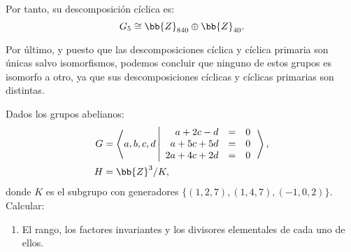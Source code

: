 \begin{ejercicio}
\begin{enumerate}
        Por tanto, su descomposición cíclica es:
        \begin{equation*}
            G_5 \cong \bb{Z}_{840} \oplus \bb{Z}_{40}.
        \end{equation*}


    \end{enumerate}

    Por último, y puesto que las descomposiciones cíclica y cíclica primaria son únicas salvo isomorfismos, podemos concluir que ninguno de estos grupos es isomorfo a otro, ya que sus descomposiciones cíclicas y cíclicas primarias son distintas.
\end{ejercicio}

\begin{ejercicio}\label{ej:7.9}
    Dados los grupos abelianos:
    \begin{align*}
        G &= \left\langle a, b, c, d \left|
            \begin{array}{rcl}
                a + 2c - d &=& 0 \\
                a + 5c + 5d &=& 0 \\
                2a + 4c + 2d &=& 0
            \end{array}
        \right.\right\rangle,\\
        H &= \bb{Z}^3/K,
    \end{align*}
    donde $K$ es el subgrupo con generadores $\{(1, 2, 7),(1, 4, 7),(-1, 0, 2)\}$. Calcular:
    \begin{enumerate}
        \item El rango, los factores invariantes y los divisores elementales de cada uno de ellos.
        

\end{enumerate}
\end{ejercicio}

